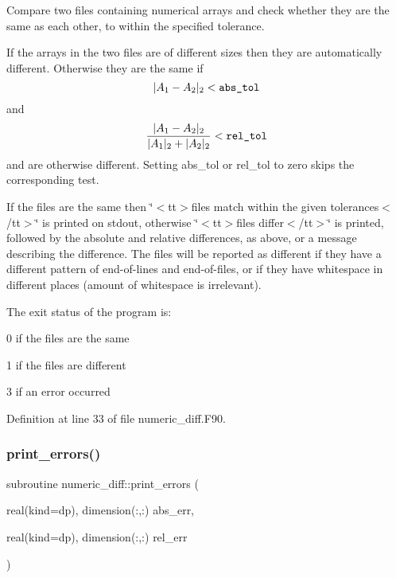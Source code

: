 Compare two files containing numerical arrays and check whether they are the same as each other, to within the specified tolerance. 

If the arrays in the two files are of different sizes then they are automatically different. Otherwise they are the same if \[ | A_1 - A_2 |_2 < \verb+abs_tol+ \] and \[ \frac{| A_1 - A_2 |_2}{| A_1 |_2 + | A_2 |_2} < \verb+rel_tol+ \] and are otherwise different. Setting {\ttfamily abs\+\_\+tol} or {\ttfamily rel\+\_\+tol} to zero skips the corresponding test.

If the files are the same then \char`\"{}$<$tt$>$files match within the given
 tolerances$<$/tt$>$\char`\"{} is printed on stdout, otherwise \char`\"{}$<$tt$>$files
 differ$<$/tt$>$\char`\"{} is printed, followed by the absolute and relative differences, as above, or a message describing the difference. The files will be reported as different if they have a different pattern of end-\/of-\/lines and end-\/of-\/files, or if they have whitespace in different places (amount of whitespace is irrelevant).

The exit status of the program is\+: \begin{DoxyItemize}
\item 0 if the files are the same \item 1 if the files are different \item 3 if an error occurred \end{DoxyItemize}


Definition at line 33 of file numeric\+\_\+diff.\+F90.

\mbox{\label{numeric__diff_8_f90_a1a449c75c493556b84502ebd0de7cb65}} 
\subsubsection{\texorpdfstring{print\+\_\+errors()}{print\_errors()}}
{\footnotesize\ttfamily subroutine numeric\+\_\+diff\+::print\+\_\+errors (\begin{DoxyParamCaption}\item[{real(kind=dp), dimension(\+:,\+:)}]{abs\+\_\+err,  }\item[{real(kind=dp), dimension(\+:,\+:)}]{rel\+\_\+err }\end{DoxyParamCaption})}


